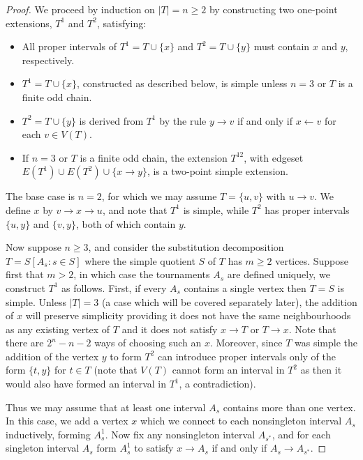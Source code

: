 \documentclass[11pt]{article}
\begin{document}
\begin{proof}
We proceed by induction on $|T|=n\geq 2$ by constructing two one-point extensions, $T^1$ and $T^2$, satisfying:
\begin{itemize}
\item All proper intervals of $T^1=T\cup\{x\}$ and $T^2=T\cup\{y\}$ must contain $x$ and $y$, respectively.
\item $T^1=T\cup\{x\}$, constructed as described below, is simple unless $n=3$ or $T$ is a finite odd chain.
\item $T^2=T\cup\{y\}$ is derived from $T^1$ by the rule $y\rightarrow v$ if and only if $x\leftarrow v$ for each $v\in V(T)$.
\item If $n=3$ or $T$ is a finite odd chain, the extension $T^{12}$, with edgeset $E(T^1)\cup E(T^2)\cup\{x\rightarrow y\}$, is a two-point simple extension.
\end{itemize}

The base case is $n=2$, for which we may assume $T=\{u,v\}$ with $u\rightarrow v$. We define $x$ by $v\rightarrow x\rightarrow u$, and note that $T^1$ is simple, while $T^2$ has proper intervals $\{u,y\}$ and $\{v,y\}$, both of which contain $y$.

Now suppose $n\geq 3$, and consider the substitution decomposition $T=S[A_s:s \in S]$ where the simple quotient $S$ of $T$ has $m\geq 2$ vertices. Suppose first that $m>2$, in which case the tournaments $A_s$ are defined uniquely, we construct $T^1$ as follows. First, if every $A_s$ contains a single vertex then $T=S$ is simple. Unless $|T|=3$ (a case which will be covered separately later), the addition of $x$ will preserve simplicity providing it does not have the same neighbourhoods as any existing vertex of $T$ and it does not satisfy $x\rightarrow T$ or $T\rightarrow x$.  Note that there are $2^n-n-2$ ways of choosing such an $x$.  Moreover, since $T$ was simple the addition of the vertex $y$ to form $T^2$ can introduce proper intervals only of the form $\{t,y\}$ for $t \in T$ (note that $V(T)$ cannot form an interval in $T^2$ as then it would also have formed an interval in $T^1$, a contradiction).

Thus we may assume that at least one interval $A_s$ contains more than one vertex. In this case, we add a vertex $x$ which we connect to each nonsingleton interval $A_s$ inductively, forming $A_s^1$. Now fix any nonsingleton interval $A_{s^*}$, and for each singleton interval $A_{s}$ form $A_{s}^1$ to satisfy $x\rightarrow A_{s}$ if and only if $A_{s}\rightarrow A_{s^*}$.


\end{proof}
\end{document}
